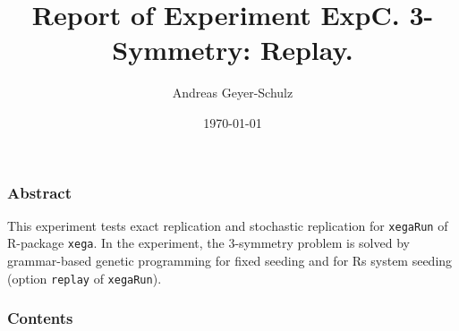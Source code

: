 \documentclass[18pt,c]{beamer}
\begin{document}
\title{Report of Experiment ExpC. 3-Symmetry: Replay. }
\author{Andreas Geyer-Schulz}
\date{\today}
\begin{frame}
\titlepage
\end{frame}
\begin{frame}
\frametitle{Abstract}
This experiment tests exact replication and stochastic replication
for {\tt xegaRun} of R-package {\tt xega}.
In the experiment, the 3-symmetry problem is solved
by grammar-based genetic programming for fixed seeding and for
Rs system seeding (option {\tt replay} of {\tt xegaRun}).%
\end{frame}
\begin{frame}[t, allowframebreaks]
\frametitle{Contents}
\tableofcontents[subsubsectionstyle=hide]
\vfill
\end{frame}
\end{document}
